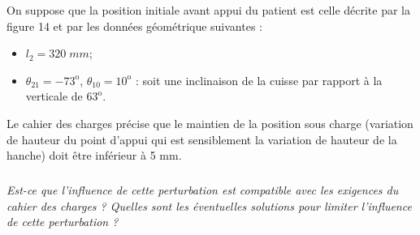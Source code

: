 \documentclass[10pt]{article}
\begin{document}
On suppose que la position initiale avant appui du patient est celle décrite par la figure 14 et par les données géométrique suivantes : 
\begin{itemize}
\item $l_2=320 \;mm$;
\item $\theta_{21}=-73^\text{o}$, $\theta_{10}=10^\text{o}$ : soit une inclinaison de la cuisse par rapport à la verticale de $63^\text{o}$.
\end{itemize}


Le cahier des charges précise que le maintien de la position sous charge (variation de hauteur du point d'appui qui est sensiblement la variation de hauteur de la hanche) doit être inférieur à 5 mm.


\subparagraph{}
\textit{Est-ce que l'influence de cette perturbation est compatible avec les exigences du cahier des charges ? Quelles sont les éventuelles solutions pour limiter l'influence de cette perturbation ?}
\end{document}
